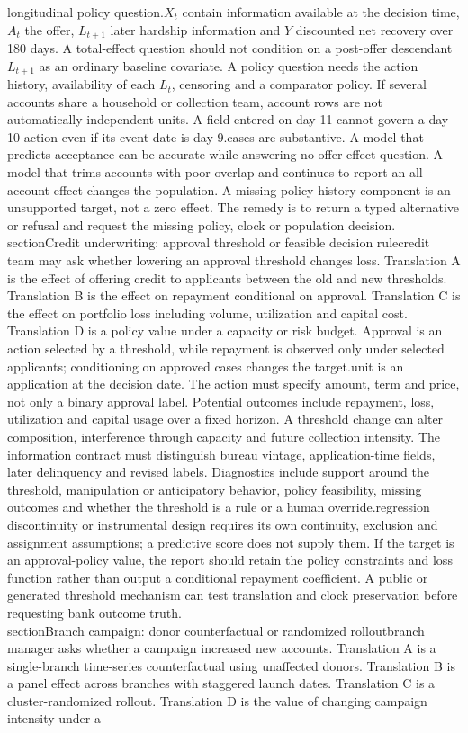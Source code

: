 longitudinal policy question.\n\nLet $X_t$ contain information available at the decision time, $A_t$ the offer, $L_{t+1}$ later hardship information and $Y$ discounted net recovery over 180 days. A total-effect question should not condition on a post-offer descendant $L_{t+1}$ as an ordinary baseline covariate. A policy question needs the action history, availability of each $L_t$, censoring and a comparator policy. If several accounts share a household or collection team, account rows are not automatically independent units. A field entered on day 11 cannot govern a day-10 action even if its event date is day 9.\n\nFailure cases are substantive. A model that predicts acceptance can be accurate while answering no offer-effect question. A model that trims accounts with poor overlap and continues to report an all-account effect changes the population. A missing policy-history component is an unsupported target, not a zero effect. The remedy is to return a typed alternative or refusal and request the missing policy, clock or population decision.\n\n\\section{Credit underwriting: approval threshold or feasible decision rule}\n\nA credit team may ask whether lowering an approval threshold changes loss. Translation A is the effect of offering credit to applicants between the old and new thresholds. Translation B is the effect on repayment conditional on approval. Translation C is the effect on portfolio loss including volume, utilization and capital cost. Translation D is a policy value under a capacity or risk budget. Approval is an action selected by a threshold, while repayment is observed only under selected applicants; conditioning on approved cases changes the target.\n\nThe unit is an application at the decision date. The action must specify amount, term and price, not only a binary approval label. Potential outcomes include repayment, loss, utilization and capital usage over a fixed horizon. A threshold change can alter composition, interference through capacity and future collection intensity. The information contract must distinguish bureau vintage, application-time fields, later delinquency and revised labels. Diagnostics include support around the threshold, manipulation or anticipatory behavior, policy feasibility, missing outcomes and whether the threshold is a rule or a human override.\n\nA regression discontinuity or instrumental design requires its own continuity, exclusion and assignment assumptions; a predictive score does not supply them. If the target is an approval-policy value, the report should retain the policy constraints and loss function rather than output a conditional repayment coefficient. A public or generated threshold mechanism can test translation and clock preservation before requesting bank outcome truth.\n\n\\section{Branch campaign: donor counterfactual or randomized rollout}\n\nA branch manager asks whether a campaign increased new accounts. Translation A is a single-branch time-series counterfactual using unaffected donors. Translation B is a panel effect across branches with staggered launch dates. Translation C is a cluster-randomized rollout. Translation D is the value of changing campaign intensity under a 